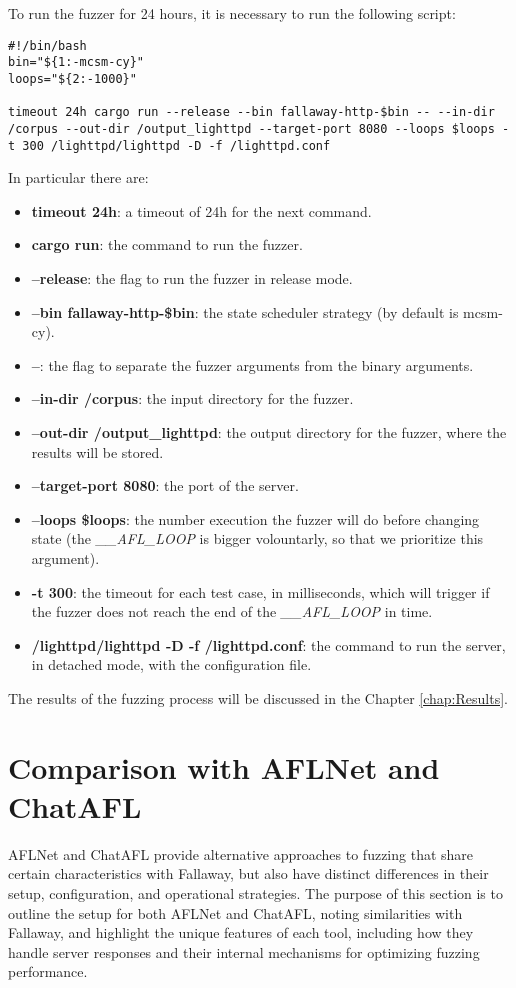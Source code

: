To run the fuzzer for 24 hours, it is necessary to run the following script:
\begin{lstlisting}
#!/bin/bash
bin="${1:-mcsm-cy}"
loops="${2:-1000}"

timeout 24h cargo run --release --bin fallaway-http-$bin -- --in-dir /corpus --out-dir /output_lighttpd --target-port 8080 --loops $loops -t 300 /lighttpd/lighttpd -D -f /lighttpd.conf
\end{lstlisting}
In particular there are:
\begin{itemize}
    \item \textbf{timeout 24h}: a timeout of 24h for the next command.
    \item \textbf{cargo run}: the command to run the fuzzer.
    \item \textbf{--release}: the flag to run the fuzzer in release mode.
    \item \textbf{--bin fallaway-http-\$bin}: the state scheduler strategy (by default is mcsm-cy).
    \item \textbf{--}: the flag to separate the fuzzer arguments from the binary arguments.
    \item \textbf{--in-dir /corpus}: the input directory for the fuzzer.
    \item \textbf{--out-dir /output\_lighttpd}: the output directory for the fuzzer, where the results will be stored.
    \item \textbf{--target-port 8080}: the port of the server.
    \item \textbf{--loops \$loops}: the number execution the fuzzer will do before changing state (the \textit{\_\_AFL\_LOOP} is bigger volountarly, so that we prioritize this argument).
    \item \textbf{-t 300}: the timeout for each test case, in milliseconds, which will trigger if the fuzzer does not reach the end of the \textit{\_\_AFL\_LOOP} in time.
    \item \textbf{/lighttpd/lighttpd -D -f /lighttpd.conf}: the command to run the server, in detached mode, with the configuration file.
\end{itemize}
The results of the fuzzing process will be discussed in the Chapter \ref{chap:Results}.

\section{Comparison with AFLNet and ChatAFL}

AFLNet and ChatAFL provide alternative approaches to fuzzing that share certain characteristics with Fallaway, but also have distinct differences in their setup, configuration, and operational strategies. The purpose of this section is to outline the setup for both AFLNet and ChatAFL, noting similarities with Fallaway, and highlight the unique features of each tool, including how they handle server responses and their internal mechanisms for optimizing fuzzing performance.

